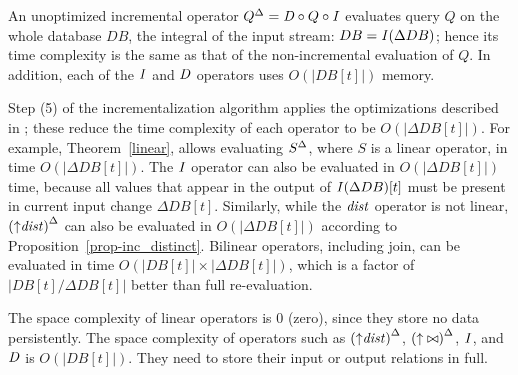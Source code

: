 An unoptimized incremental operator ${Q}^{\Delta} = \mathit{D} \circ Q \circ \mathit{I}$
evaluates query $Q$ on the whole database $DB$, the integral of the input stream:
$DB = \mathit{I}(\Delta DB)$; hence its time complexity  is the same as that of the non-incremental
evaluation of $Q$.  In addition, each of the $\mathit{I}$ and $\mathit{D}$ operators uses $O(|DB[t]|)$ memory.

Step (5) of the incrementalization algorithm applies the optimizations
described in ; these reduce the time
complexity of each operator to be $O(|\Delta DB[t]|)$.  For example,
Theorem~\ref{linear}, allows evaluating ${S}^{\Delta}$, where $S$ is a
linear operator, in time $O(|\Delta DB[t]|)$.  The $\mathit{I}$ operator can
also be evaluated in $O(|\Delta DB[t]|)$ time, because all values that
appear in the output of $\mathit{I}(\Delta DB)[t]$ must be present in current
input change $\Delta DB[t]$.  Similarly, while the $\mathit{dist}$
operator is not linear, ${({\uparrow}\mathit{dist})}^{\Delta}$ can also be
evaluated in $O(|\Delta DB[t]|)$ according to
Proposition~\ref{prop-inc_distinct}.  Bilinear operators, including
join, can be evaluated in time $O(|DB[t]| \times |\Delta DB[t]|)$,
which is a factor of $|DB[t] / \Delta DB[t]|$ better than full
re-evaluation.

The space complexity of linear operators is 0 (zero), since they store no
data persistently.  The space complexity of operators such as ${({\uparrow}\mathit{dist})}^{\Delta}$,
${({\uparrow}\bowtie)}^{\Delta}$, $\mathit{I}$, and $\mathit{D}$ is $O(|DB[t]|)$.  They need
to store their input or output relations in full.

